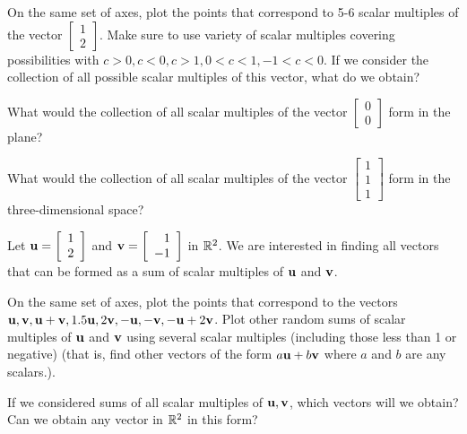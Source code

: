 \begin{pa}
\ba
\item On the same set of axes, plot the points that correspond to 5-6 scalar multiples of the vector $\left[ \begin{array}{c} 1 \\ 2 \end{array} \right]$. Make sure to use  variety of scalar multiples covering possibilities with $c>0, c<0, c>1, 0<c<1, -1<c<0$. If we consider the collection of all possible scalar multiples of this vector, what do we obtain?

\item What would the collection of all scalar multiples of the vector $\left[ \begin{array}{c} 0 \\ 0 \end{array} \right]$ form in the plane? 

 \item What would the collection of all scalar multiples of the vector $\left[ \begin{array}{c} 1 \\ 1\\ 1 \end{array} \right]$ form in the three-dimensional space? 

\ea

\item Let $\mathbf{u}=\left[ \begin{array}{c} 1\\ 2 \end{array} \right]$ and $\mathbf{v}=\left[ \begin{array}{r} 1\\ -1 \end{array} \right]$ in $\mathbb{R}^2$. We are interested in finding all vectors that can be formed as a sum of scalar multiples of $\mathbf{u}$ and $\mathbf{v}$.
\ba
\item On the same set of axes, plot the points that correspond to the vectors $\mathbf{u}, \mathbf{v}, \mathbf{u}+\mathbf{v}, 1.5\mathbf{u}, 2\mathbf{v}, -\mathbf{u}, -\mathbf{v}, -\mathbf{u}+2\mathbf{v}$.  Plot other random sums of scalar multiples of $\mathbf{u}$ and $\mathbf{v}$ using several scalar multiples (including those less than 1 or negative) (that is, find other vectors of the form $a\mathbf{u} + b\mathbf{v}$ where $a$ and $b$ are any scalars.).


\item If we considered sums of all scalar multiples of $\mathbf{u}, \mathbf{v}$, which vectors will we obtain? Can we obtain any vector in $\mathbb{R}^2$ in this form?



\ea


\ee


\end{pa}


